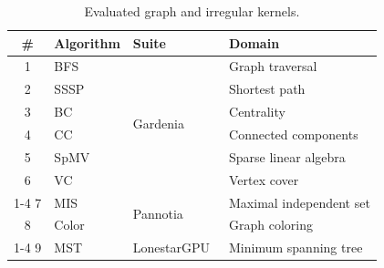 \begin{table}[t]
  \caption{Evaluated graph and irregular kernels.}
  \label{tab:algorithms}
  \centering
  \small
  \begin{tabular}{@{}clll@{}}
    \toprule
    \textbf{\#} & \textbf{Algorithm} & \textbf{Suite} & \textbf{Domain} \\
    \midrule
    1 & BFS    & \multirow{6}{*}{Gardenia~\cite{xu2019gardenia}} & Graph traversal \\
    2 & SSSP   &                                                  & Shortest path \\
    3 & BC     &                                                  & Centrality \\
    4 & CC     &                                                  & Connected components \\
    5 & SpMV   &                                                  & Sparse linear algebra \\
    6 & VC     &                                                  & Vertex cover \\
    \cmidrule(lr){1-4}
    7 & MIS    & \multirow{2}{*}{Pannotia~\cite{che2013pannotia}} & Maximal independent set \\
    8 & Color  &                                                  & Graph coloring \\
    \cmidrule(lr){1-4}
    9 & MST    & LonestarGPU~\cite{burtscher2012irregular}        & Minimum spanning tree \\
    \bottomrule
  \end{tabular}
\end{table}



